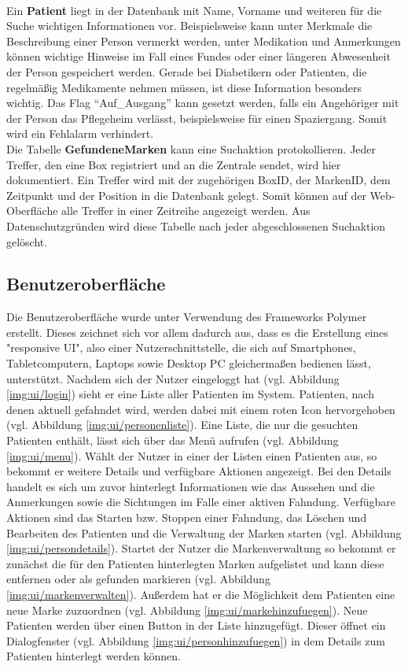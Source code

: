 \\Ein \textbf{Patient} liegt in der Datenbank mit Name, Vorname und weiteren für die Suche wichtigen Informationen vor. Beispielsweise kann unter Merkmale die Beschreibung einer Person vermerkt werden, unter Medikation und Anmerkungen können wichtige Hinweise im Fall eines Fundes oder einer längeren Abwesenheit der Person gespeichert werden. Gerade bei Diabetikern oder Patienten, die regelmäßig Medikamente nehmen müssen, ist diese Information besonders wichtig. Das Flag \enquote{Auf\_Ausgang} kann gesetzt werden, falls ein Angehöriger mit der Person das Pflegeheim verlässt, beispielsweise für einen Spaziergang. Somit wird ein Fehlalarm verhindert.
\\Die Tabelle \textbf{GefundeneMarken} kann eine Suchaktion protokollieren. Jeder Treffer, den eine Box registriert und an die Zentrale sendet, wird hier dokumentiert. Ein Treffer wird mit der zugehörigen BoxID, der MarkenID, dem Zeitpunkt und der Position in die Datenbank gelegt. Somit können auf der Web-Oberfläche alle Treffer in einer Zeitreihe angezeigt werden. Aus Datenschutzgründen wird diese Tabelle nach jeder abgeschlossenen Suchaktion gelöscht.

\subsection{Benutzeroberfläche}
Die Benutzeroberfläche wurde unter Verwendung des Frameworks Polymer erstellt. Dieses zeichnet sich vor allem dadurch aus, dass es die Erstellung eines "responsive UI", also einer Nutzerschnittstelle, die sich auf Smartphones, Tabletcomputern, Laptops sowie Desktop PC gleichermaßen bedienen lässt, unterstützt.\newline
Nachdem sich der Nutzer eingeloggt hat (vgl. Abbildung \ref{img:ui/login}) sieht er eine Liste aller Patienten im System. Patienten, nach denen aktuell gefahndet wird, werden dabei mit einem roten Icon hervorgehoben (vgl. Abbildung \ref{img:ui/personenliste}). Eine Liste, die nur die gesuchten Patienten enthält, lässt sich über das Menü aufrufen (vgl. Abbildung \ref{img:ui/menu}). \newline
Wählt der Nutzer in einer der Listen einen Patienten aus, so bekommt er weitere Details und verfügbare Aktionen angezeigt. Bei den Details handelt es sich um zuvor hinterlegt Informationen wie das Aussehen und die Anmerkungen sowie die Sichtungen im Falle einer aktiven Fahndung. Verfügbare Aktionen sind das Starten bzw. Stoppen einer Fahndung, das Löschen und Bearbeiten des Patienten und die Verwaltung der Marken starten (vgl. Abbildung \ref{img:ui/persondetails}). \newline
Startet der Nutzer die Markenverwaltung so bekommt er zunächst die für den Patienten hinterlegten Marken aufgelistet und kann diese entfernen oder als gefunden markieren (vgl. Abbildung \ref{img:ui/markenverwalten}). Außerdem hat er die Möglichkeit dem Patienten eine neue Marke zuzuordnen (vgl. Abbildung \ref{img:ui/markehinzufuegen}). \newline
Neue Patienten werden über einen Button in der Liste hinzugefügt. Dieser öffnet ein Dialogfenster (vgl. Abbildung \ref{img:ui/personhinzufuegen}) in dem Details zum Patienten hinterlegt werden können.


